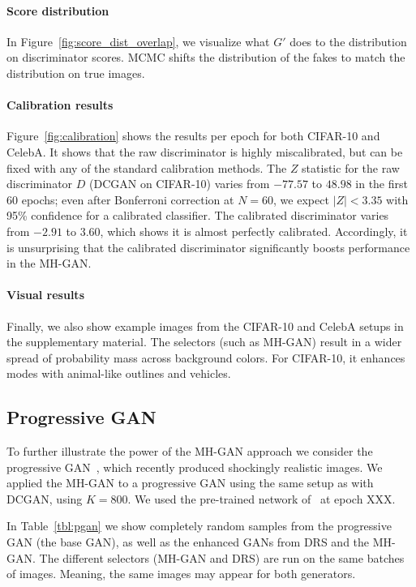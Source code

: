 \documentclass{article}
\begin{document}
\paragraph{Score distribution}
In Figure~\ref{fig:score_dist_overlap}, we visualize what $G'$ does to the distribution on discriminator scores.
MCMC shifts the distribution of the fakes to match the distribution on true images.

\paragraph{Calibration results}
Figure~\ref{fig:calibration} shows the results per epoch for both CIFAR-10 and CelebA\@.
It shows that the raw discriminator is highly miscalibrated, but can be fixed with any of the standard calibration methods.
The $Z$ statistic for the raw discriminator $D$ (DCGAN on CIFAR-10) varies from $-77.57$ to $48.98$ in the first 60 epochs; even after Bonferroni correction at $N \!\!=\!\! 60$, we expect $|Z| < 3.35$ with 95\% confidence for a calibrated classifier.
The calibrated discriminator varies from $-2.91$ to $3.60$, which shows it is almost perfectly calibrated.
Accordingly, it is unsurprising that the calibrated discriminator significantly boosts performance in the MH-GAN\@.

\paragraph{Visual results}
Finally, we also show example images from the CIFAR-10 and CelebA setups in the supplementary material.
The selectors (such as MH-GAN) result in a wider spread of probability mass across background colors.
For CIFAR-10, it enhances modes with animal-like outlines and vehicles.

\subsection{Progressive GAN}

To further illustrate the power of the MH-GAN approach we consider the progressive GAN~\citep{}, which recently produced shockingly realistic images.
We applied the MH-GAN to a progressive GAN using the same setup as with DCGAN, using $K=800$.
We used the pre-trained network of~\citet{} at epoch XXX.  %

In Table~\ref{tbl:pgan} we show completely random samples from the progressive GAN (the base GAN), as well as the enhanced GANs from DRS and the MH-GAN\@.
The different selectors (MH-GAN and DRS) are run on the same batches of images.
Meaning, the same images may appear for both generators.
\end{document}
